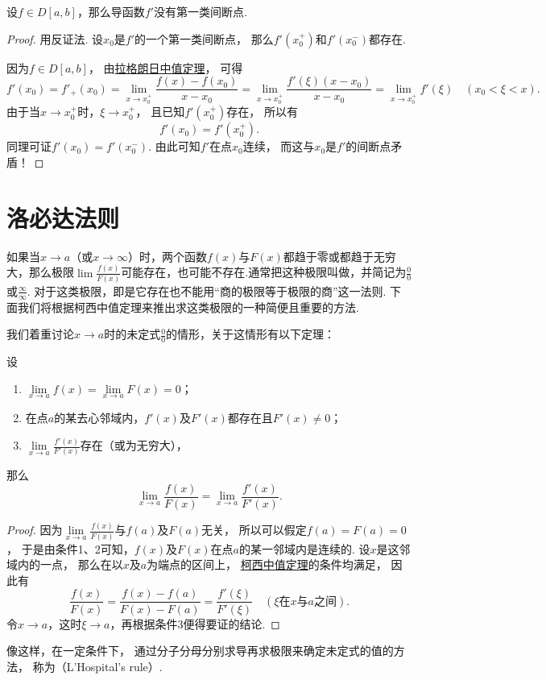 \begin{theorem}
设\(f \in D[a,b]\)，那么导函数\(f'\)没有第一类间断点.
\begin{proof}
用反证法.
设\(x_0\)是\(f'\)的一个第一类间断点，
那么\(f'(x_0^+)\)和\(f'(x_0^-)\)都存在.

因为\(f \in D[a,b]\)，
由\hyperref[theorem:微分中值定理.拉格朗日中值定理]{拉格朗日中值定理}，
可得\[
	f'(x_0)
	= f'_+(x_0)
	= \lim_{x \to x_0^+} \frac{f(x)-f(x_0)}{x-x_0}
	= \lim_{x \to x_0^+} \frac{f'(\xi) (x-x_0)}{x-x_0}
	= \lim_{x \to x_0^+} f'(\xi)
	\quad(x_0<\xi<x).
\]
由于当\(x \to x_0^+\)时，\(\xi \to x_0^+\)，
且已知\(f'(x_0^+)\)存在，
所以有\[
	f'(x_0)=f'(x_0^+).
\]
同理可证\(f'(x_0)=f'(x_0^-)\).
由此可知\(f'\)在点\(x_0\)连续，
而这与\(x_0\)是\(f'\)的间断点矛盾！
\end{proof}
\end{theorem}

\section{洛必达法则}
如果当\(x \to a\)（或\(x \to \infty\)）时，两个函数\(f(x)\)与\(F(x)\)都趋于零或都趋于无穷大，那么极限\(\lim\frac{f(x)}{F(x)}\)可能存在，也可能不存在.通常把这种极限叫做，并简记为\(\frac{0}{0}\)或\(\frac{\infty}{\infty}\).
对于这类极限，即是它存在也不能用“商的极限等于极限的商”这一法则.
下面我们将根据柯西中值定理来推出求这类极限的一种简便且重要的方法.

我们着重讨论\(x \to a\)时的未定式\(\frac{0}{0}\)的情形，关于这情形有以下定理：
\begin{theorem}\label{theorem:微分中值定理.洛必达法则1}
设\begin{enumerate}
	\item \(\lim\limits_{x\to a} f(x) = \lim\limits_{x\to a} F(x) = 0\)；
	\item 在点\(a\)的某去心邻域内，\(f'(x)\)及\(F'(x)\)都存在且\(F'(x) \neq 0\)；
	\item \(\lim\limits_{x \to a} \frac{f'(x)}{F'(x)}\)存在（或为无穷大），
\end{enumerate}
那么\[
	\lim\limits_{x \to a} \frac{f(x)}{F(x)}
	= \lim\limits_{x \to a} \frac{f'(x)}{F'(x)}.
\]
\begin{proof}
因为\(\lim\limits_{x\to a} \frac{f(x)}{F(x)}\)与\(f(a)\)及\(F(a)\)无关，
所以可以假定\(f(a)=F(a)=0\)，
于是由条件1、2可知，\(f(x)\)及\(F(x)\)在点\(a\)的某一邻域内是连续的.
设\(x\)是这邻域内的一点，
那么在以\(x\)及\(a\)为端点的区间上，
\hyperref[theorem:微分中值定理.柯西中值定理]{柯西中值定理}的条件均满足，
因此有\[
	\frac{f(x)}{F(x)}
	= \frac{f(x)-f(a)}{F(x)-F(a)}
	= \frac{f'(\xi)}{F'(\xi)}
	\quad(\text{\(\xi\)在\(x\)与\(a\)之间}).
\]
令\(x \to a\)，这时\(\xi \to a\)，再根据条件3便得要证的结论.
\end{proof}
\end{theorem}
像这样，在一定条件下，
通过分子分母分别求导再求极限来确定未定式的值的方法，
称为（L'Hospital's rule）.

